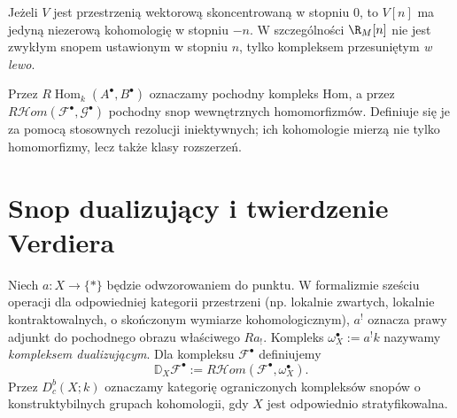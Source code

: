 \begin{przyklad}
Jeżeli $V$ jest przestrzenią wektorową skoncentrowaną
w stopniu $0$, to $V[n]$ ma jedyną niezerową kohomologię
w stopniu $-n$. W szczególności $\R_M[n]$ nie jest
zwykłym snopem ustawionym w stopniu $n$, tylko
kompleksem przesuniętym \emph{w lewo}.
\end{przyklad}

\begin{definicja}
Przez $R\!\operatorname{Hom}_k(A^\bullet,B^\bullet)$
oznaczamy pochodny kompleks Hom, a przez
$R\mathcal Hom(\mathcal F^\bullet,\mathcal G^\bullet)$
pochodny snop wewnętrznych homomorfizmów.
Definiuje się je za pomocą stosownych rezolucji
iniektywnych; ich kohomologie mierzą nie tylko
homomorfizmy, lecz także klasy rozszerzeń.
\end{definicja}

\section{Snop dualizujący i twierdzenie Verdiera}
\begin{definicja}
\label{def:verdier-v12}
Niech $a:X\to\{*\}$ będzie odwzorowaniem do punktu.
W formalizmie sześciu operacji dla odpowiedniej kategorii
przestrzeni (np. lokalnie zwartych, lokalnie kontraktowalnych,
o skończonym wymiarze kohomologicznym), $a^!$ oznacza
prawy adjunkt do pochodnego obrazu właściwego $Ra_!$.
Kompleks
$\omega_X^\bullet:=a^!k$ nazywamy \emph{kompleksem dualizującym}.
Dla kompleksu $\mathcal F^\bullet$ definiujemy
\[
\mathbb D_X\mathcal F^\bullet
:=R\mathcal Hom(\mathcal F^\bullet,\omega_X^\bullet).
\]
Przez $D^b_c(X;k)$ oznaczamy kategorię ograniczonych
kompleksów snopów o konstruktybilnych grupach kohomologii,
gdy $X$ jest odpowiednio stratyfikowalna.
\end{definicja}

